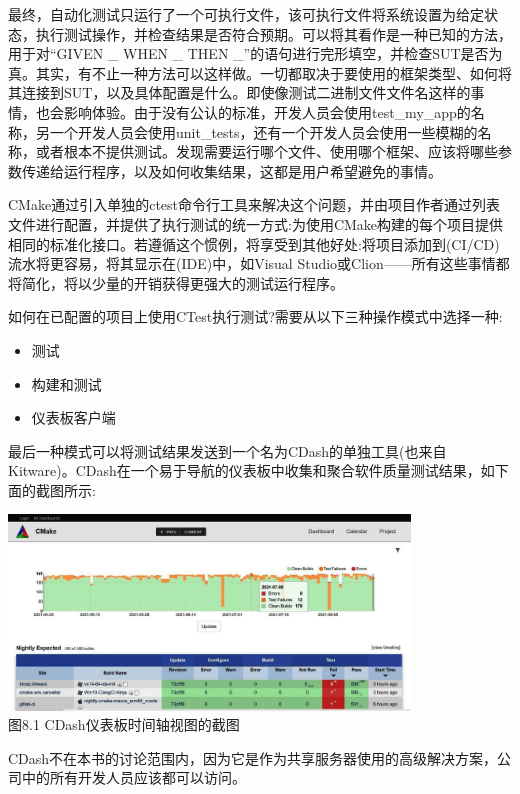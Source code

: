 
最终，自动化测试只运行了一个可执行文件，该可执行文件将系统设置为给定状态，执行测试操作，并检查结果是否符合预期。可以将其看作是一种已知的方法，用于对“GIVEN \_ WHEN \_ THEN \_”的语句进行完形填空，并检查SUT是否为真。其实，有不止一种方法可以这样做。一切都取决于要使用的框架类型、如何将其连接到SUT，以及具体配置是什么。即使像测试二进制文件文件名这样的事情，也会影响体验。由于没有公认的标准，开发人员会使用test\_my\_app的名称，另一个开发人员会使用unit\_tests，还有一个开发人员会使用一些模糊的名称，或者根本不提供测试。发现需要运行哪个文件、使用哪个框架、应该将哪些参数传递给运行程序，以及如何收集结果，这都是用户希望避免的事情。

CMake通过引入单独的ctest命令行工具来解决这个问题，并由项目作者通过列表文件进行配置，并提供了执行测试的统一方式:为使用CMake构建的每个项目提供相同的标准化接口。若遵循这个惯例，将享受到其他好处:将项目添加到(CI/CD)流水将更容易，将其显示在(IDE)中，如Visual Studio或Clion——所有这些事情都将简化，将以少量的开销获得更强大的测试运行程序。

如何在已配置的项目上使用CTest执行测试?需要从以下三种操作模式中选择一种:

\begin{itemize}
\item 
测试

\item 
构建和测试

\item 
仪表板客户端
\end{itemize}

最后一种模式可以将测试结果发送到一个名为CDash的单独工具(也来自Kitware)。CDash在一个易于导航的仪表板中收集和聚合软件质量测试结果，如下面的截图所示:

\begin{center}
\includegraphics[width=0.8\textwidth]{content/3/chapter8/images/1.jpg}\\
图8.1 CDash仪表板时间轴视图的截图
\end{center}

CDash不在本书的讨论范围内，因为它是作为共享服务器使用的高级解决方案，公司中的所有开发人员应该都可以访问。

